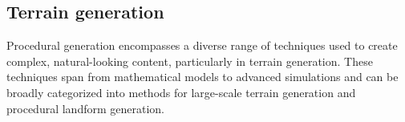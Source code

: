 






\subsection{Terrain generation}
Procedural generation encompasses a diverse range of techniques used to create complex, natural-looking content, particularly in terrain generation. These techniques span from mathematical models to advanced simulations and can be broadly categorized into methods for large-scale terrain generation and procedural landform generation. 

